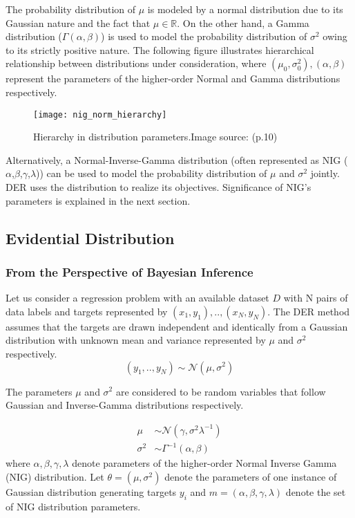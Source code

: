 	The probability distribution of $\mu$ is modeled by a normal distribution due to its Gaussian nature and the fact that $\mu \in \mathbb{R}$. On the other hand, a Gamma distribution    ($\Gamma(\alpha, \beta)$) is used to model the probability distribution of $\sigma^2$ owing to its strictly positive nature. The following figure illustrates hierarchical relationship between distributions under consideration, where $(\mu_0,\sigma^{2}_0),(\alpha,\beta)$ represent the parameters of the higher-order Normal and Gamma distributions respectively.
	
	\begin{figure}[h]
		\centering
		\texttt{[image: nig\_norm\_hierarchy]}
		\caption[Hierarchy in distribution parameters]{Hierarchy in distribution parameters.Image source: \cite{conjprior10} (p.10)}
		\label{fig_nig_norm_hierarchy}
	\end{figure}
	
	Alternatively, a Normal-Inverse-Gamma distribution (often represented as NIG ($\alpha$,$\beta$,$\gamma$,$\lambda$)) can be used to model the probability distribution of $\mu$ and $\sigma^2$ jointly. DER uses the distribution to realize its objectives. Significance of NIG's parameters is explained in the next section.
	
	\subsection{Evidential Distribution}\label{sec_evidential_dist}
	\subsubsection{From the Perspective of Bayesian Inference}\label{sec_persp_bayes}
	Let us consider a regression problem with an available dataset $D$ with N pairs of data labels and targets represented by $(x_1,y_1),..,(x_N,y_N)$. The DER method assumes that the targets are  drawn independent and identically from a Gaussian distribution with unknown mean and variance represented by $\mu$ and $\sigma^2$ respectively.
	\begin{equation}
		(y_1,..,y_N) \sim \mathcal{N}(\mu,\sigma^2)
	\end{equation} 
	
	The parameters $\mu$ and $\sigma^2$ are considered to be random variables that follow Gaussian and Inverse-Gamma distributions respectively.
	
	\begin{align}
		\mu &\sim \mathcal{N}(\gamma,\sigma^2\lambda^{-1})\\
		\sigma^2 &\sim \Gamma^{-1}(\alpha,\beta)
	\end{align}
	where $\alpha, \beta, \gamma, \lambda$ denote parameters of the higher-order Normal Inverse Gamma (NIG) distribution. Let $\theta = (\mu,\sigma^2)$ denote the parameters of one instance of Gaussian distribution generating targets $y_{i}$  and $m = (\alpha, \beta, \gamma, \lambda)$ denote the set of NIG distribution parameters.
	
